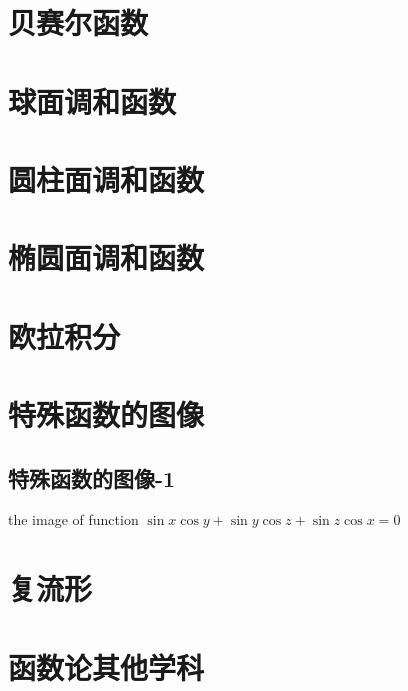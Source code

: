 \documentclass[UTF8]{../../09-Mathematics}
\begin{document}
    \section{贝赛尔函数}
    \section{球面调和函数}
    \section{圆柱面调和函数}
    \section{椭圆面调和函数}
    \section{欧拉积分}

\section{特殊函数的图像}
    \subsection{特殊函数的图像-1}

    the image of function 
    $\sin x \cos y + \sin y \cos z + \sin z \cos x = 0$



\section{复流形}



\section{函数论其他学科}
\end{document}
